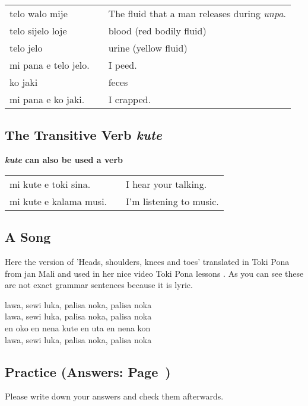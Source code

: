 \begin{supertabular}{p{5,5cm}|ll}
    telo walo mije       &  & The fluid that a man releases during \textit{unpa}. \\
    telo sijelo loje     &  & blood (red bodily fluid)                            \\
    telo jelo            &  & urine (yellow fluid)                                \\
    mi pana e telo jelo. &  & I peed.                                             \\
    ko jaki              &  & feces                                               \\
    mi pana e ko jaki.   &  & I crapped.                                          \\
\end{supertabular}

\subsection*{The Transitive Verb \textit{kute}}
\textbf{\textit{kute} can also be used a verb} \\
\begin{supertabular}{p{5,5cm}|ll}
    mi kute e toki sina.   &  & I hear your talking.    \\
    mi kute e kalama musi. &  & I'm listening to music. \\
\end{supertabular}

\subsection*{A Song}
Here the version of 'Heads, shoulders, knees and toes' translated in Toki Pona from jan Mali and used in her nice video Toki Pona lessons \cite{www:astrodonunt:02}.
As you can see these are not exact grammar sentences because it is lyric.

lawa, sewi luka, palisa noka, palisa noka \\
lawa, sewi luka, palisa noka, palisa noka \\
en oko en nena kute en uta en nena kon \\
lawa, sewi luka, palisa noka, palisa noka \\

\newpage

\subsection*{Practice (Answers: Page~\pageref{'the_body'})}
Please write down your answers and check them afterwards.

